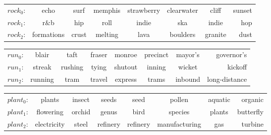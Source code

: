 \begin{center} \begin{tabular}{l*{6}{c}r}   $rock_0$: &echo& surf& memphis& strawberry& clearwater& cliff& sunset  \\  $rock_1$: & r$\&$b& hip& roll& indie& ska& indie& hop  
 \\  $rock_2$: &formations& crust& melting& lava& boulders& granite& dust   \\  \end{tabular} \end{center}
 
 \begin{center} \begin{tabular}{l*{6}{c}r}   $run_0$: & blair& taft& fraser& monroe& precinct& mayor's& governor's  \\  $run_1$: & streak& rushing& tying& shutout& inning& wicket& kickoff
 \\  $run_2$: &running& tram& travel& express& trams& inbound& long-distance \\  \end{tabular} \end{center}
 
 \begin{center} \begin{tabular}{l*{6}{c}r}   $plant_0$: &plants& insect& seeds& seed& pollen& aquatic& organic  \\  $plant_1$: &flowering& orchid& genus& bird& species& plants& butterfly
 \\  $plant_2$: &electricity& steel& refinery& refinery& manufacturing& gas& turbine  \\  \end{tabular} \end{center}

